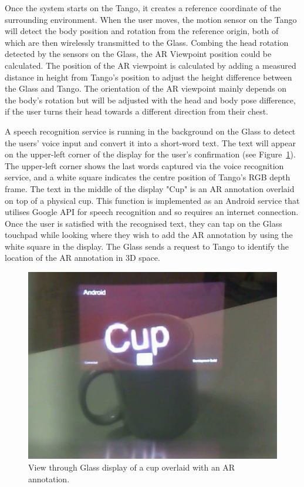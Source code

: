 Once the system starts on the Tango, it creates a reference coordinate of the surrounding environment. When the user moves, the motion sensor on the Tango will detect the body position and rotation from the reference origin, both of which are then wirelessly transmitted to the Glass. Combing the head rotation detected by the sensors on the Glass, the AR Viewpoint position could be calculated. The position of the AR viewpoint is calculated by adding a measured distance in height from Tango's position to adjust the height difference between the Glass and Tango. The orientation of the AR viewpoint mainly depends on the body's rotation but will be adjusted with the head and body pose difference, if the user turns their head towards a different direction from their chest. 

A speech recognition service is running in the background on the Glass to detect the users' voice input and convert it into a short-word text. The text will appear on the upper-left corner of the display for the user's confirmation (see Figure~\ref{fig:mgia15:ui}). The upper-left corner shows the last words captured via the voice recognition service, and a white square indicates the centre position of Tango's RGB depth frame. The text in the middle of the display "Cup" is an AR annotation overlaid on top of a physical cup. This function is implemented as an Android service that utilises Google API for speech recognition and so requires an internet connection. Once the user is satisfied with the recognised text, they can tap on the Glass touchpad while looking where they wish to add the AR annotation by using the white square in the display. The Glass sends a request to Tango to identify the location of the AR annotation in 3D space.

\begin{figure}
  \centering
  \includegraphics[width=0.6\linewidth]{images/62-3d-mgia15/WIN_20150614_204531_2.jpg}
  \caption{View through Glass display of a cup overlaid with an AR annotation.}
  \label{fig:mgia15:ui}
\end{figure}

